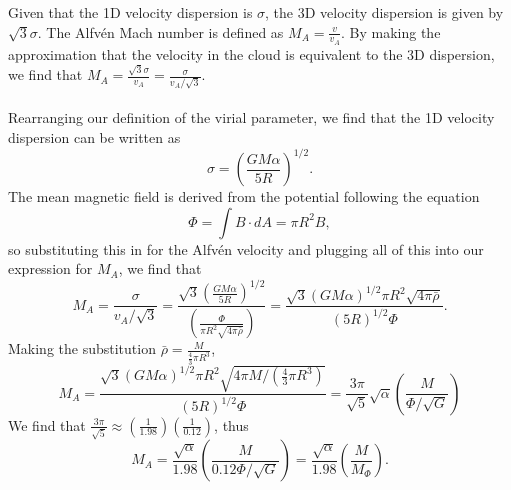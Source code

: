 \documentclass[11pt]{article}
\newenvironment{tight_enumerate}{
\begin{enumerate}[label=(\alph*)]
\setlength{\itemsep}{3pt}
\setlength{\parskip}{0pt}
}{\end{enumerate}}
\begin{document}
\begin{tight_enumerate}
\newpage
\item Given that the 1D velocity dispersion is $\sigma$, the 3D velocity dispersion is given by $\sqrt{3}\sigma$. The Alfv\'en Mach number is defined as $M_{A} = \frac{v}{v_{A}}$. By making the approximation that the velocity in the cloud is equivalent to the 3D dispersion, we find that $M_{A} = \frac{\sqrt{3}\sigma}{v_{A}} = \frac{\sigma}{v_{A}/\sqrt{3}}$.\\
\\
Rearranging our definition of the virial parameter, we find that the 1D velocity dispersion can be written as 
\[\sigma = \left(\frac{GM\alpha}{5R}\right)^{1/2}.\]
The mean magnetic field is derived from the potential following the equation 
\[\Phi = \int{B \cdot dA} = {\pi}R^{2}B,\]
so substituting this in for the Alfv\'en velocity and plugging all of this into our expression for $M_{A}$, we find that 
\[M_{A} = \frac{\sigma}{v_{A}/\sqrt{3}} = \frac{\sqrt{3}\left(\frac{GM\alpha}{5R}\right)^{1/2}}{\left(\frac{\Phi}{{\pi}R^{2}\sqrt{4\pi\bar\rho}}\right)} = \frac{\sqrt{3}(GM\alpha)^{1/2}{\pi}R^{2}\sqrt{4\pi\bar\rho}}{(5R)^{1/2}\Phi}.\]
Making the substitution $\bar\rho = \frac{M}{\frac{4}{3}{\pi}R^{3}}$, 
\[M_{A} = \frac{\sqrt{3}(GM\alpha)^{1/2}{\pi}R^{2}\sqrt{4{\pi}M/\left(\frac{4}{3}{\pi}R^{3}\right)}}{(5R)^{1/2}\Phi} = \frac{3\pi}{\sqrt{5}}\sqrt{\alpha}\left(\frac{M}{\Phi/\sqrt{G}}\right)\]
We find that $\frac{3\pi}{\sqrt{5}} \approx \left(\frac{1}{1.98}\right)\left(\frac{1}{0.12}\right)$, thus
\[M_{A} = \frac{\sqrt{\alpha}}{1.98}\left(\frac{M}{0.12\Phi/\sqrt{G}}\right) = \frac{\sqrt{\alpha}}{1.98}\left(\frac{M}{M_{\Phi}}\right).\]
\end{tight_enumerate}


\newpage
\end{document}
